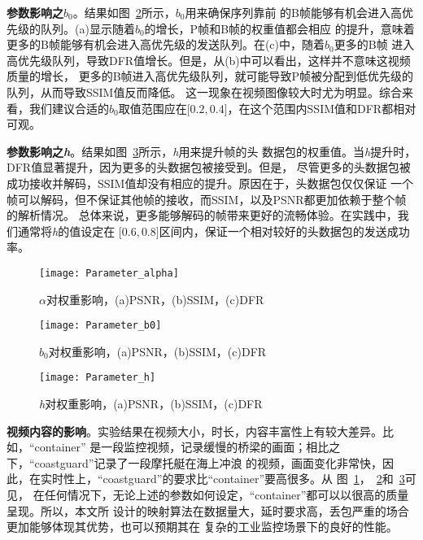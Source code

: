 \textbf{参数影响之$b_{0}$}。结果如图~\ref{fig:parameter_b0}所示，$b_{0}$用来确保序列靠前
的B帧能够有机会进入高优先级的队列。(a)显示随着$b_{0}$的增长，P帧和B帧的权重值都会相应
的提升，意味着更多的B帧能够有机会进入高优先级的发送队列。在(c)中，随着$b_{0}$更多的B帧
进入高优先级队列，导致DFR值增长。但是，从(b)中可以看出，这样并不意味这视频质量的增长，
更多的B帧进入高优先级队列，就可能导致P帧被分配到低优先级的队列，从而导致SSIM值反而降低。
这一现象在视频图像较大时尤为明显。综合来看，我们建议合适的$b_{0}$取值范围应在$\lbrack0.2,
0.4\rbrack$，在这个范围内SSIM值和DFR都相对可观。

\textbf{参数影响之\emph{h}}。结果如图~\ref{fig:parameter_h}所示，\emph{h}用来提升帧的头
数据包的权重值。当\emph{h}提升时，DFR值显著提升，因为更多的头数据包被接受到。但是，
尽管更多的头数据包被成功接收并解码，SSIM值却没有相应的提升。原因在于，头数据包仅仅保证
一个帧可以解码，但不保证其他帧的接收，而SSIM，以及PSNR都更加依赖于整个帧的解析情况。
总体来说，更多能够解码的帧带来更好的流畅体验。在实践中，我们通常将\emph{h}的值设定在
$\lbrack0.6,0.8\rbrack$区间内，保证一个相对较好的头数据包的发送成功率。

\begin{figure}[H] %
  \centering
  \texttt{[image: Parameter\_alpha]}
  \caption{$\alpha$对权重影响，(a)PSNR，(b)SSIM，(c)DFR}
  \label{fig:parameter_alpha}
\end{figure}
\begin{figure}[H] %
  \centering
  \texttt{[image: Parameter\_b0]}
  \caption{$b_{0}$对权重影响，(a)PSNR，(b)SSIM，(c)DFR}
  \label{fig:parameter_b0}
\end{figure}
\begin{figure}[H] %
  \centering
  \texttt{[image: Parameter\_h]}
  \caption{\emph{h}对权重影响，(a)PSNR，(b)SSIM，(c)DFR}
  \label{fig:parameter_h}
\end{figure}

\textbf{视频内容的影响}。实验结果在视频大小，时长，内容丰富性上有较大差异。比如，“container”
是一段监控视频，记录缓慢的桥梁的画面；相比之下，“coastguard”记录了一段摩托艇在海上冲浪
的视频，画面变化非常快，因此，在实时性上，“coastguard”的要求比“container”要高很多。从
图~\ref{fig:parameter_alpha}，~\ref{fig:parameter_b0}和~\ref{fig:parameter_h}可见，
在任何情况下，无论上述的参数如何设定，“container”都可以以很高的质量呈现。所以，本文所
设计的映射算法在数据量大，延时要求高，丢包严重的场合更加能够体现其优势，也可以预期其在
复杂的工业监控场景下的良好的性能。


